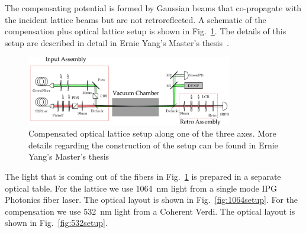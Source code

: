 The compensating potential is formed by Gaussian beams that co-propagate with
the incident lattice beams but are not retroreflected.  A schematic of the
compensation plus optical lattice setup is shown in
Fig.~\ref{fig:comp-latt-schem}.   The details of this setup are described in
detail in Ernie Yang's Master's thesis~\cite{ErnieMs}.  
\begin{figure}
\centering
\includegraphics[width=0.8\textwidth]{../ernie-figures/lattice/assembly/latticesassembly.pdf}
\caption[Compensated lattice axis]{\small Compensated optical lattice setup
along one of the three axes.  More details regarding the construction of the
setup can be found in Ernie Yang's Master's thesis~\cite{ErnieMs}}
\label{fig:comp-latt-schem} 
\end{figure}
The light that is coming out of the fibers in Fig.~\ref{fig:comp-latt-schem} is
prepared in a separate optical table.  For the lattice we use 1064~nm light
from a single mode IPG Photonics fiber laser.   The optical layout is shown in
Fig.~\ref{fig:1064setup}.   For the compensation we use 532~nm light from a
Coherent Verdi.  The optical layout is shown in Fig.~\ref{fig:532setup}. 
 
